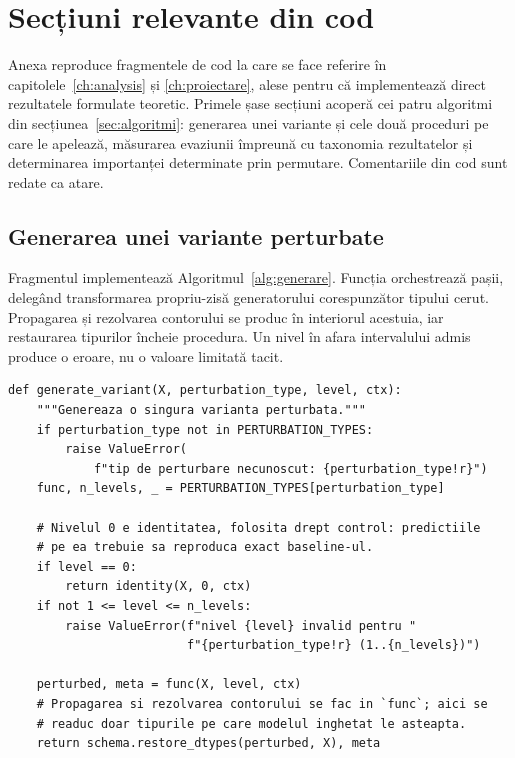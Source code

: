 \appendix
\chapter{Secțiuni relevante din cod}\label{ch:anexa-cod}
\pagestyle{fancy}

Anexa reproduce fragmentele de cod la care se face referire în capitolele~\ref{ch:analysis} și \ref{ch:proiectare}, alese pentru că implementează direct rezultatele formulate teoretic. Primele șase secțiuni acoperă cei patru algoritmi din secțiunea~\ref{sec:algoritmi}: generarea unei variante și cele două proceduri pe care le apelează, măsurarea evaziunii împreună cu taxonomia rezultatelor și determinarea importanței determinate prin permutare. Comentariile din cod sunt redate ca atare.

\section{Generarea unei variante perturbate}\label{sec:anexa-generare}

Fragmentul implementează Algoritmul~\ref{alg:generare}. Funcția orchestrează pașii, delegând transformarea propriu-zisă generatorului corespunzător tipului cerut. Propagarea și rezolvarea contorului se produc în interiorul acestuia, iar restaurarea tipurilor încheie procedura. Un nivel în afara intervalului admis produce o eroare, nu o valoare limitată tacit.

\begin{verbatim}
def generate_variant(X, perturbation_type, level, ctx):
    """Genereaza o singura varianta perturbata."""
    if perturbation_type not in PERTURBATION_TYPES:
        raise ValueError(
            f"tip de perturbare necunoscut: {perturbation_type!r}")
    func, n_levels, _ = PERTURBATION_TYPES[perturbation_type]

    # Nivelul 0 e identitatea, folosita drept control: predictiile
    # pe ea trebuie sa reproduca exact baseline-ul.
    if level == 0:
        return identity(X, 0, ctx)
    if not 1 <= level <= n_levels:
        raise ValueError(f"nivel {level} invalid pentru "
                         f"{perturbation_type!r} (1..{n_levels})")

    perturbed, meta = func(X, level, ctx)
    # Propagarea si rezolvarea contorului se fac in `func`; aici se
    # readuc doar tipurile pe care modelul inghetat le asteapta.
    return schema.restore_dtypes(perturbed, X), meta
\end{verbatim}


